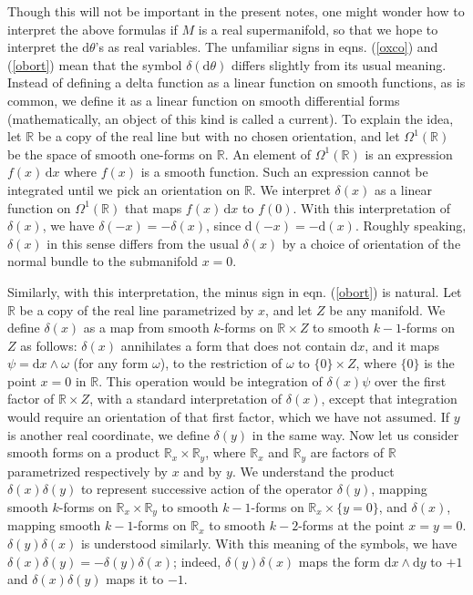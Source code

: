 \documentclass[11pt,a4paper]{article}
\def\d{{\mathrm d}}
\def\R{{\mathbb R}}
\begin{document}
Though this will not be important in the present notes,  
one might wonder how to interpret the  above formulas if $M$ is a real supermanifold, so that we hope to interpret the $\d\theta$'s as real
 variables.  The unfamiliar signs in eqns. (\ref{oxco}) and (\ref{obort}) mean that the symbol $\delta(\d\theta)$ differs slightly from its usual meaning.
 Instead of defining a delta function as a linear function on smooth functions, as is common, we define it as a linear function on smooth differential forms (mathematically,
 an object of this kind is called a current).  To explain the idea,
 let $\R$ be a copy of the real line but with no chosen orientation, and let $\Omega^1(\R)$ be the space of smooth one-forms on $\R$.  An element
 of $\Omega^1(\R)$ is an expression $f(x)\,\d x$ where $f(x)$ is a smooth function.  Such an expression cannot be integrated until we pick an orientation on $\R$.
 We interpret $\delta(x)$ as a linear function on $\Omega^1(\R)$ that maps $f(x)\,\d x$ to $f(0)$. 
 With this interpretation of $\delta(x)$, we have $\delta(-x)=-\delta(x)$, since $\d(-x)=-\d(x)$.  Roughly speaking, $\delta(x)$ in this sense differs
 from the usual $\delta(x)$ by a choice of orientation of the normal bundle to the submanifold $x=0$.
 
 Similarly, with this interpretation, the minus sign in eqn. (\ref{obort}) is natural.  Let $\R$ be a copy of the real line parametrized
 by $x$, and let $Z$ be any manifold.  We define $\delta(x)$ as a map from smooth $k$-forms on $\R\times Z$ to smooth $k-1$-forms
 on $Z$ as follows: $\delta(x)$ annihilates a form that does not contain $\d x$, and it maps $\psi=\d x \wedge \omega$ (for any form $\omega$),
 to the restriction of $\omega$ to $\{0\}\times Z$, where $\{0\}$ is the point $x=0$ in $\R$.  This operation would be integration of 
 $\delta(x)\psi$  over the
 first factor of $\R\times Z$, with a standard interpretation of $\delta(x)$,
 except that integration would require an orientation of that first factor, which we have not assumed.
  If $y$ is another real coordinate, we define
 $\delta(y)$ in the same way.  Now let us consider smooth forms on a product $\R_x\times \R_y$, where $\R_x$ and $\R_y$ are factors of 
 $\R$ parametrized respectively by $x$ and by $y$.  We understand the product $\delta(x)\delta(y)$ to represent successive action of the operator
 $\delta(y)$, mapping smooth $k$-forms on $\R_x\times \R_y$ to smooth $k-1$-forms on $\R_x\times \{y=0\}$, and $\delta(x)$, mapping smooth
 $k-1$-forms on $\R_x$ to smooth $k-2$-forms at the point $x=y=0$.  $\delta(y)\delta(x)$ is understood similarly.  With this meaning
 of the symbols, we have $\delta(x)\delta(y)=-\delta(y)\delta(x)$; indeed, $\delta(y)\delta(x)$ maps the form $\d x\wedge \d y$ to $+1$
 and $\delta(x)\delta(y)$ maps it to $-1$.
 
\end{document}
